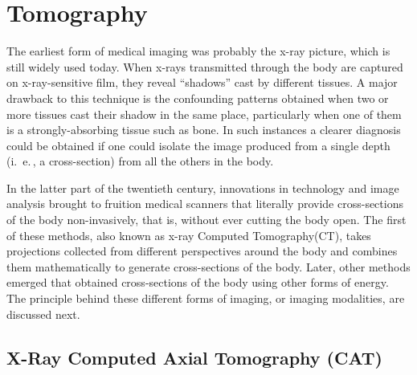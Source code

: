 \section{Tomography}

The earliest form of medical imaging was probably the x-ray picture, which is still widely used today.  When x-rays transmitted through the body are captured on x-ray-sensitive film, they reveal ``shadows'' cast by different tissues.  A major drawback to this technique is the confounding patterns obtained when two or more tissues cast their shadow in the same place, particularly when one of them is a strongly-absorbing tissue such as bone. In such instances a clearer diagnosis could be obtained if one could isolate the image produced from a single depth (i.~e.\,, a cross-section) from all the others in the body.

In the latter part of the twentieth century, innovations in technology and image analysis brought to fruition medical scanners that literally provide cross-sections of the body non-invasively, that is, without ever cutting the body open. The first of these methods, also known as x-ray Computed Tomography(CT), takes projections collected from different perspectives around the body and combines them mathematically to generate cross-sections of the body. Later, other methods emerged that obtained cross-sections of the body using other forms of energy. The principle behind these different forms of imaging, or imaging modalities, are discussed next.

\subsection{X-Ray Computed Axial Tomography (CAT)}

